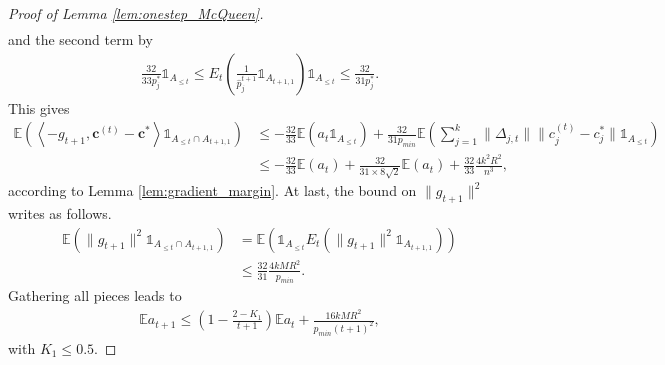 \documentclass[noinfoline,preprint]{article}
\newcommand{\cb}{\mathbf{c}}
\newcommand{\E}{\mathbb{E}}
\renewcommand{\1}{\mathds 1}
\begin{document}
\begin{proof}[Proof of Lemma \ref{lem:onestep_McQueen}]
\begin{multline*}
\end{multline*}
and the second term by
\begin{align*}
\frac{32}{33p_j^*}\1_{A_{\leq t}} \leq E_t \left (\frac{1}{\hat{p}_j^{t+1}} \1_{A_{t+1,1}} \right ) \1_{A_{\leq t}} \leq \frac{32}{31p_j^*}.
\end{align*}
This gives
\begin{align*}
\E \left ( \left\langle - g_{t+1},\cb^{(t)} - \cb^* \right\rangle \1_{A_{\leq t}\cap A_{t+1,1}} \right ) & \leq - \frac{32}{33} \E \left (a_t \1_{A_{\leq t}} \right ) + \frac{32}{31 p_{min}} \E \left (  \sum_{j=1}^k \| \Delta_{j,t} \| \|c_j^{(t)} - c_j^*\| \1_{A_{\leq t}} \right ) \\
& \leq - \frac{32}{33} \E(a_t) + \frac{32}{31 \times 8 \sqrt{2}} \E(a_t) + \frac{32}{33} \frac{4k^2R^2}{n^3},
\end{align*}
according to Lemma \ref{lem:gradient_margin}. At last, the bound on $\|g_{t+1}\|^2$ writes as follows.
\begin{align*}
\E \left ( \|g_{t+1}\|^2 \1_{A_{\leq t} \cap A_{t+1,1}} \right ) & = \E \left ( \1_{A_{\leq t}} E_t \left ( \|g_{t+1}\|^2 \1_{A_{t+1,1}}\right ) \right ) \\
&\leq \frac{32}{31} \frac{4kMR^2}{p_{min}}.
\end{align*}
Gathering all pieces leads to
\begin{align*}
\E a_{t+1} \leq \left ( 1 - \frac{2-K_1}{t+1} \right ) \E a_t + \frac{16 kMR^2}{p_{min}(t+1)^2},
\end{align*}
with $K_1 \leq 0.5$.


\end{proof}
\end{document}
